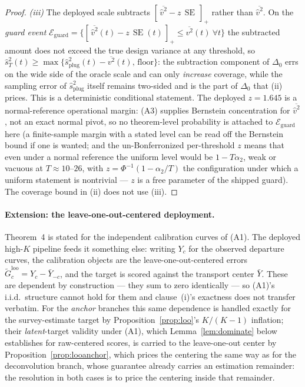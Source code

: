 \documentclass[12pt]{article}
\theoremstyle{definition}
\theoremstyle{remark}
\DeclareMathOperator{\SE}{SE}
\begin{document}
\begin{proof}
\emph{(iii)} The deployed scale subtracts $[\,\overline{\widehat v^2}-z\,\SE\,]_+$
rather than $\overline{\widehat v^2}$. On the \emph{guard event}
$\mathcal E_{\text{guard}}=\{[\,\overline{\widehat v^2}(t)-z\,\SE(t)\,]_+\le
\overline{v^2}(t)\ \forall t\}$ the subtracted amount does not exceed the true
design variance at any threshold, so
$\widehat s_T^2(t)\ge\max\{\widehat s_{\text{plug}}^2(t)-\overline{v^2}(t),\,\text{floor}\}$:
the subtraction component of $\Delta_0$ errs on the wide side of the oracle
scale and can only \emph{increase} coverage, while the sampling error of
$\widehat s_{\text{plug}}^2$ itself remains two-sided and is the part of
$\Delta_0$ that (ii) prices. This is a
deterministic conditional statement. The deployed $z=1.645$ is a
normal-reference operational margin: (A3) supplies Bernstein concentration for
$\overline{\widehat v^2}$, not an exact normal pivot, so no theorem-level
probability is attached to $\mathcal E_{\text{guard}}$ here (a finite-sample
margin with a stated level can be read off the Bernstein bound if one is
wanted; and the un-Bonferronized per-threshold $z$ means that even under a
normal reference the uniform level would be $1-T\alpha_2$, weak or vacuous at
$T\approx10$--$26$, with $z=\Phi^{-1}(1-\alpha_2/T)$ the configuration under
which a uniform statement is nontrivial --- $z$ is a free parameter of the
shipped guard). The coverage bound in (ii) does not use (iii).
\end{proof}

\paragraph{Extension: the leave-one-out-centered deployment.} Theorem~4
is stated for the independent calibration curves of (A1). The deployed
high-$K$ pipeline feeds it something else: writing $Y_c$ for the observed
departure curves, the calibration objects are the leave-one-out-centered
errors $\widetilde G^{\text{loo}}_c=Y_c-\bar Y_{-c}$, and the target is
scored against the transport center $\bar Y$. These are dependent by
construction --- they sum to zero identically --- so (A1)'s i.i.d.\ structure
cannot hold for them and clause~(i)'s exactness does not transfer verbatim.
For the \emph{anchor} branches this same dependence is handled exactly for
the survey-estimate target by Proposition~\ref{prop:loo}'s $K/(K{-}1)$
inflation; their \emph{latent}-target validity under (A1), which
Lemma~\ref{lem:dominate} below establishes for raw-centered scores, is
carried to the leave-one-out center by Proposition~\ref{prop:looanchor},
which prices the centering the same way as for the deconvolution branch,
whose guarantee already carries an estimation remainder: the
resolution in both cases is to price the centering inside that remainder.
\end{document}
